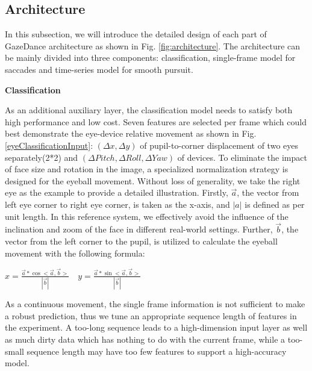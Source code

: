 \documentclass[acmlarge]{acmart}
\begin{document}
\subsection{Architecture}\label{subsec:model_2}
In this subsection, we will introduce the detailed design of each part of GazeDance architecture as shown in Fig. \ref{fig:architecture}. The architecture can be mainly divided into three components: classification, single-frame model for saccades and time-series model for smooth pursuit.

\textbf{Classification} \label{classification}

As an additional auxiliary layer, the classification model needs to satisfy both high performance and low cost. Seven features are selected per frame which could best demonstrate the eye-device relative movement as shown in Fig. \ref{eyeClassificationInput}: $(\Delta x,\Delta y)$ of pupil-to-corner displacement of two eyes separately(2*2) and $(\Delta Pitch, \Delta Roll, \Delta Yaw)$ of devices. To eliminate the impact of face size and rotation in the image, a specialized normalization strategy is designed for the eyeball movement. Without loss of generality, we take the right eye as the example to provide a detailed illustration. Firstly, $\Vec{a}$, the vector from left eye corner to right eye corner, is taken as the x-axis, and $\left| a \right|$ is defined as per unit length. In this reference system, we effectively avoid the influence of the inclination and zoom of the face in different real-world settings. Further, $\Vec{b}$, the vector from the left corner to the pupil, is utilized to calculate the eyeball movement with the following formula:

\begin{center}
\begin{math}
x = \frac{\vec a * \cos< \vec a, \vec b >}{\left| \vec b \right|} \quad
y = \frac{\vec a * \sin< \vec a, \vec b >}{\left| \vec b \right|}
\end{math}
\end{center}

As a continuous movement, the single frame information is not sufficient to make a robust prediction, thus we tune an appropriate sequence length of features in the experiment. A too-long sequence leads to a high-dimension input layer as well as much dirty data which has nothing to do with the current frame, while a too-small sequence length may have too few features to support a high-accuracy model. 
\end{document}
